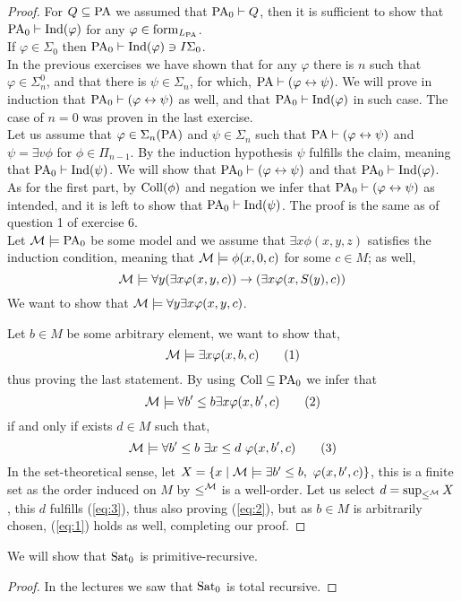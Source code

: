 \begin{proof}
	For $Q \subseteq \operatorname{PA}$ we assumed that $\operatorname{PA}_0 \vdash Q$, then it is sufficient to show that $\operatorname{PA}_0 \vdash \operatorname{Ind}(\varphi)$ for any $\varphi \in \operatorname{form}_{L_{\operatorname{PA}}}$. \\
	If $\varphi \in \Sigma_0$ then $\operatorname{PA}_0 \vdash \operatorname{Ind}(\varphi) \ni I \Sigma_0$. \\
	In the previous exercises we have shown that for any $\varphi$ there is $n$ such that $\varphi \in \Sigma_n^0$, and that there is $\psi \in \Sigma_n$, for which, $\operatorname{PA} \vdash (\varphi \leftrightarrow \psi)$.
	We will prove in induction that $\operatorname{PA}_0 \vdash (\varphi \leftrightarrow \psi)$ as well, and that $\operatorname{PA}_0 \vdash \operatorname{Ind}(\varphi)$ in such case.
	The case of $n = 0$ was proven in the last exercise. \\
	Let us assume that $\varphi \in \Sigma_n(\operatorname{PA})$ and $\psi \in \Sigma_n$ such that $\operatorname{PA} \vdash (\varphi \leftrightarrow \psi)$ and $\psi = \exists v \phi$ for $\phi \in \Pi_{n - 1}$.
	By the induction hypothesis $\psi$ fulfills the claim, meaning that $\operatorname{PA}_0 \vdash \operatorname{Ind}(\psi)$.
	We will show that $\operatorname{PA}_0 \vdash (\varphi \leftrightarrow \psi)$ and that $\operatorname{PA}_0 \vdash \operatorname{Ind}(\varphi)$. \\
	As for the first part, by $\operatorname{Coll}(\phi)$ and negation we infer that $\operatorname{PA}_0 \vdash (\varphi \leftrightarrow \psi)$ as intended, and it is left to show that $\operatorname{PA}_0 \vdash \operatorname{Ind}(\psi)$.
	The proof is the same as of question 1 of exercise 6. \\
	Let $\mathcal{M} \models \operatorname{PA}_0$ be some model and we assume that $\exists x \phi(x, y, z)$ satisfies the induction condition, meaning that $\mathcal{M} \models \phi(x, 0, c)$ for some $c \in M$;
	as well,
	\[
		\mathcal{M} \models \forall y (\exists x \varphi(x, y, c)) \to (\exists x \varphi(x, S(y), c))
	\]
	We want to show that $\mathcal{M} \models \forall y \exists x \varphi(x, y, c)$. 

	Let $b \in M$ be some arbitrary element, we want to show that,
	\[ \label{eq:1}
		\mathcal{M} \models \exists x \varphi(x, b, c)
		\tag{1}
	\]
	thus proving the last statement.
	By using $\operatorname{Coll} \subseteq \operatorname{PA}_0$ we infer that
	\[ \label{eq:2}
		\mathcal{M} \models \forall b' \le b \exists x \varphi(x, b', c)
		\tag{2}
	\]
	if and only if exists $d \in M$ such that,
	\[ \label{eq:3}
		\mathcal{M}
		\models \forall b' \le b\ \exists x \le d\ \varphi(x, b', c)
		\tag{3}
	\]
	In the set-theoretical sense, let $X = \{ x \mid \Mm \models \exists b' \le b,\ \varphi(x, b', c) \}$, this is a finite set as the order induced on $M$ by $\le^{\mathcal{M}}$ is a well-order.
	Let us select $d = \sup_{\le^{\mathcal{M}}} X$, this $d$ fulfills (\ref{eq:3}), thus also proving (\ref{eq:2}), but as $b \in M$ is arbitrarily chosen, (\ref{eq:1}) holds as well, completing our proof.
\end{proof}

\question[3]
We will show that $\operatorname{Sat}_0$ is primitive-recursive.
\begin{proof}
	In the lectures we saw that $\operatorname{Sat}_0$ is total recursive.
\end{proof}


